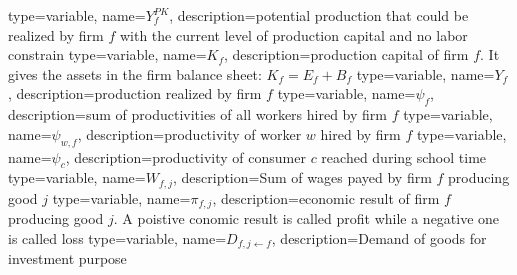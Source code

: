 {%
  type=variable,%
  name={$Y^{PK}_{f}$},%
  description={potential production that could be realized by firm $f$ with the current level of production capital and no labor constrain} 
}
{%
  type=variable,%
  name={$K_{f}$},%
  description={production capital of firm $f$. It gives the assets in the firm balance sheet: $K_f=E_f+B_f$} 
}
{%
  type=variable,%
  name={$Y_{f}$},%
  description={production realized by firm $f$} 
}
{%
  type=variable,%
  name={$\psi_{f}$},%
  description={sum of productivities of all workers hired by firm $f$} 
}
{%
  type=variable,%
  name={$\psi_{w,f}$},%
  description={productivity of worker $w$ hired by firm $f$} 
}
{%
  type=variable,%
  name={$\psi_{c}$},%
  description={productivity of consumer $c$ reached during school time} 
}
{%
  type=variable,%
  name={$W_{f,j}$},%
  description={Sum of wages payed by firm $f$ producing good $j$} 
}
{%
  type=variable,%
  name={$\pi_{f,j}$},%
  description={economic result of firm $f$ producing good $j$. A poistive conomic result is called profit while a negative one is called loss} 
}
{%
  type=variable,%
  name={$D_{f,j\leftarrow f}$},%
  description={Demand of goods for investment purpose} 
}
